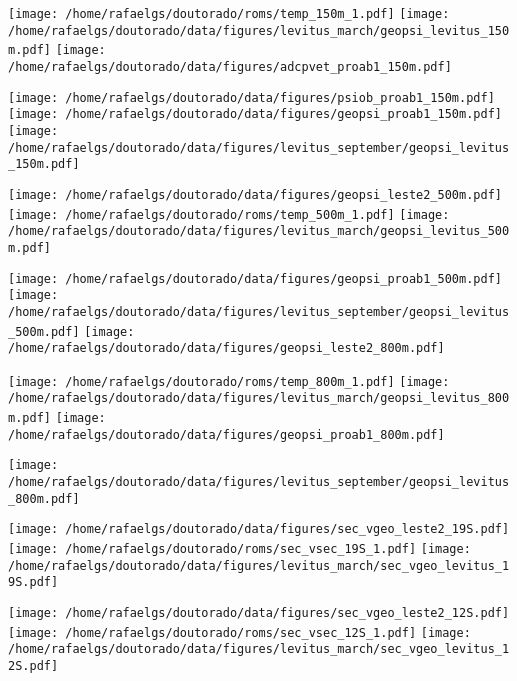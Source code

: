 \documentclass[12pt,portuguese,a4paper,pdftex]{article}
\begin{document}
\texttt{[image: /home/rafaelgs/doutorado/roms/temp\_150m\_1.pdf]}
\texttt{[image: /home/rafaelgs/doutorado/data/figures/levitus\_march/geopsi\_levitus\_150m.pdf]}
\texttt{[image: /home/rafaelgs/doutorado/data/figures/adcpvet\_proab1\_150m.pdf]}

\texttt{[image: /home/rafaelgs/doutorado/data/figures/psiob\_proab1\_150m.pdf]}
\texttt{[image: /home/rafaelgs/doutorado/data/figures/geopsi\_proab1\_150m.pdf]}
\texttt{[image: /home/rafaelgs/doutorado/data/figures/levitus\_september/geopsi\_levitus\_150m.pdf]}

\texttt{[image: /home/rafaelgs/doutorado/data/figures/geopsi\_leste2\_500m.pdf]}
\texttt{[image: /home/rafaelgs/doutorado/roms/temp\_500m\_1.pdf]}
\texttt{[image: /home/rafaelgs/doutorado/data/figures/levitus\_march/geopsi\_levitus\_500m.pdf]}

\texttt{[image: /home/rafaelgs/doutorado/data/figures/geopsi\_proab1\_500m.pdf]}
\texttt{[image: /home/rafaelgs/doutorado/data/figures/levitus\_september/geopsi\_levitus\_500m.pdf]}
\texttt{[image: /home/rafaelgs/doutorado/data/figures/geopsi\_leste2\_800m.pdf]}

\texttt{[image: /home/rafaelgs/doutorado/roms/temp\_800m\_1.pdf]}
\texttt{[image: /home/rafaelgs/doutorado/data/figures/levitus\_march/geopsi\_levitus\_800m.pdf]}
\texttt{[image: /home/rafaelgs/doutorado/data/figures/geopsi\_proab1\_800m.pdf]}

\texttt{[image: /home/rafaelgs/doutorado/data/figures/levitus\_september/geopsi\_levitus\_800m.pdf]}

\texttt{[image: /home/rafaelgs/doutorado/data/figures/sec\_vgeo\_leste2\_19S.pdf]}
\texttt{[image: /home/rafaelgs/doutorado/roms/sec\_vsec\_19S\_1.pdf]}
\texttt{[image: /home/rafaelgs/doutorado/data/figures/levitus\_march/sec\_vgeo\_levitus\_19S.pdf]}

\texttt{[image: /home/rafaelgs/doutorado/data/figures/sec\_vgeo\_leste2\_12S.pdf]}
\texttt{[image: /home/rafaelgs/doutorado/roms/sec\_vsec\_12S\_1.pdf]}
\texttt{[image: /home/rafaelgs/doutorado/data/figures/levitus\_march/sec\_vgeo\_levitus\_12S.pdf]}
\end{document}
